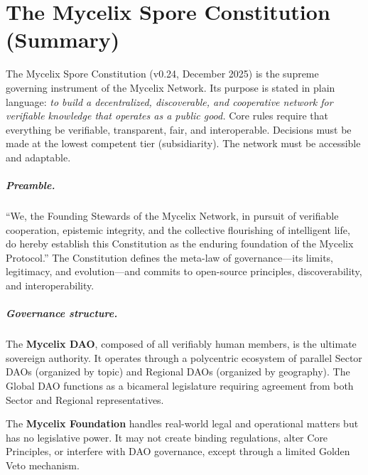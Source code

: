 \documentclass[12pt]{book}
\begin{document}

\appendix

\chapter{The Mycelix Spore Constitution (Summary)}
\label{app:constitution}

The Mycelix Spore Constitution (v0.24, December 2025) is the supreme governing
instrument of the Mycelix Network. Its purpose is stated in plain language:
\emph{to build a decentralized, discoverable, and cooperative network for
verifiable knowledge that operates as a public good.} Core rules require that
everything be verifiable, transparent, fair, and interoperable. Decisions must
be made at the lowest competent tier (subsidiarity). The network must be
accessible and adaptable.

\paragraph{Preamble.}
``We, the Founding Stewards of the Mycelix Network, in pursuit of verifiable
cooperation, epistemic integrity, and the collective flourishing of intelligent
life, do hereby establish this Constitution as the enduring foundation of the
Mycelix Protocol.'' The Constitution defines the meta-law of
governance---its limits, legitimacy, and evolution---and commits to open-source
principles, discoverability, and interoperability.

\paragraph{Governance structure.}
The \textbf{Mycelix DAO}, composed of all verifiably human members, is the
ultimate sovereign authority. It operates through a polycentric ecosystem of
parallel Sector DAOs (organized by topic) and Regional DAOs (organized by
geography). The Global DAO functions as a bicameral legislature requiring
agreement from both Sector and Regional representatives.

The \textbf{Mycelix Foundation} handles real-world legal and operational matters
but has no legislative power. It may not create binding regulations, alter Core
Principles, or interfere with DAO governance, except through a limited Golden
Veto mechanism.
\end{document}
